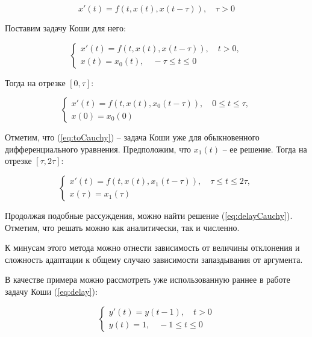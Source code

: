 \begin{equation}
x'(t) = f(t,x(t),x(t-\tau)), \quad \tau>0
\end{equation}

Поставим задачу Коши для него:

\begin{equation}\label{eq:delayCauchy}
\left\{
\begin{aligned}
x'(t) = f(t,x(t),x(t-\tau)), \quad t>0,\\
x(t) = x_0(t), \quad -\tau \leq t \leq 0
\end{aligned}
\right.
\end{equation}

Тогда на отрезке $[0,\tau]$:

\begin{equation}\label{eq:toCauchy}
\left\{
\begin{aligned}
x'(t) = f(t,x(t),x_0(t-\tau)), \quad 0 \leq t \leq \tau,\\
x(0) = x_0(0)
\end{aligned}
\right.
\end{equation}

Отметим, что (\ref{eq:toCauchy}) \--- задача Коши уже для обыкновенного дифференциального уравнения. Предположим, что $x_1(t)$ \--- ее решение. Тогда на отрезке $[\tau,2\tau]$:

\begin{equation}\label{eq:toCauchy}
\left\{
\begin{aligned}
x'(t) = f(t,x(t),x_1(t-\tau)), \quad \tau \leq t \leq 2\tau,\\
x(\tau) = x_1(\tau)
\end{aligned}
\right.
\end{equation}

Продолжая подобные рассуждения, можно найти решение (\ref{eq:delayCauchy}). Отметим, что решать можно как аналитически, так и численно.

К минусам этого метода можно отнести зависимость от величины отклонения и сложность адаптации к общему случаю зависимости запаздывания от аргумента.

В качестве примера можно рассмотреть уже использованную раннее в работе задачу Коши (\ref{eq:delay}):

\begin{equation*}
\left\{
\begin{aligned}
y'(t) = y(t-1), \quad t>0\\
y(t) = 1, \quad -1 \leq t \leq 0
\end{aligned}
\right.
\end{equation*}

